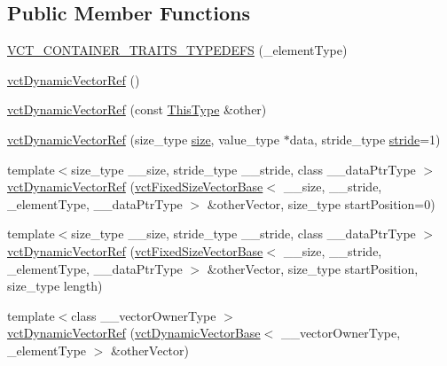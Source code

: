 \subsection*{Public Member Functions}
\begin{DoxyCompactItemize}
\item 
\hyperlink{classvct_dynamic_vector_ref_a7b91ca027434e642a95493c01d9f4850}{V\-C\-T\-\_\-\-C\-O\-N\-T\-A\-I\-N\-E\-R\-\_\-\-T\-R\-A\-I\-T\-S\-\_\-\-T\-Y\-P\-E\-D\-E\-F\-S} (\-\_\-element\-Type)
\item 
\hyperlink{classvct_dynamic_vector_ref_a94dc8bfb87bb02b8c6864df04ba13b54}{vct\-Dynamic\-Vector\-Ref} ()
\item 
\hyperlink{classvct_dynamic_vector_ref_aa33fd081ff01a142874aa28ea63a1222}{vct\-Dynamic\-Vector\-Ref} (const \hyperlink{classvct_dynamic_vector_ref_adde8a247e72c476120c26cfa15a37c6d}{This\-Type} \&other)
\item 
\hyperlink{classvct_dynamic_vector_ref_a3651eeb9024ce9fa002b891595e0c71f}{vct\-Dynamic\-Vector\-Ref} (size\-\_\-type \hyperlink{classvct_dynamic_const_vector_base_a79950d8cced7fd4e790d9ac2ca1c43a7}{size}, value\-\_\-type $\ast$data, stride\-\_\-type \hyperlink{classvct_dynamic_const_vector_base_af0440ce847480b353e9f85edccc03158}{stride}=1)
\item 
{\footnotesize template$<$size\-\_\-type \-\_\-\-\_\-size, stride\-\_\-type \-\_\-\-\_\-stride, class \-\_\-\-\_\-data\-Ptr\-Type $>$ }\\\hyperlink{classvct_dynamic_vector_ref_a1bfc3a8bf0cb548aed6749c863f5a51e}{vct\-Dynamic\-Vector\-Ref} (\hyperlink{classvct_fixed_size_vector_base}{vct\-Fixed\-Size\-Vector\-Base}$<$ \-\_\-\-\_\-size, \-\_\-\-\_\-stride, \-\_\-element\-Type, \-\_\-\-\_\-data\-Ptr\-Type $>$ \&other\-Vector, size\-\_\-type start\-Position=0)
\item 
{\footnotesize template$<$size\-\_\-type \-\_\-\-\_\-size, stride\-\_\-type \-\_\-\-\_\-stride, class \-\_\-\-\_\-data\-Ptr\-Type $>$ }\\\hyperlink{classvct_dynamic_vector_ref_adce7f010121a1d319af95c647a858691}{vct\-Dynamic\-Vector\-Ref} (\hyperlink{classvct_fixed_size_vector_base}{vct\-Fixed\-Size\-Vector\-Base}$<$ \-\_\-\-\_\-size, \-\_\-\-\_\-stride, \-\_\-element\-Type, \-\_\-\-\_\-data\-Ptr\-Type $>$ \&other\-Vector, size\-\_\-type start\-Position, size\-\_\-type length)
\item 
{\footnotesize template$<$class \-\_\-\-\_\-vector\-Owner\-Type $>$ }\\\hyperlink{classvct_dynamic_vector_ref_a4d2eafa71764b8ac451d301a7032cc72}{vct\-Dynamic\-Vector\-Ref} (\hyperlink{classvct_dynamic_vector_base}{vct\-Dynamic\-Vector\-Base}$<$ \-\_\-\-\_\-vector\-Owner\-Type, \-\_\-element\-Type $>$ \&other\-Vector)

\end{DoxyCompactItemize}
